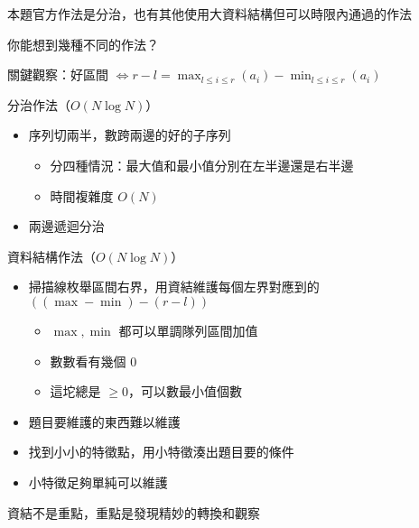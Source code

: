 \begin{frame}{}
    本題官方作法是分治，也有其他使用大資料結構但可以時限內通過的作法

    你能想到幾種不同的作法？
\end{frame}

\begin{frame}{}
    關鍵觀察：好區間 $\iff r - l = \max_{l \leq i \leq r}(a_i) - \min_{l \leq i \leq r}(a_i)$

     {
        分治作法（$O(N \log N)$）
    
        \begin{itemize}
            \item 序列切兩半，數跨兩邊的好的子序列
            \begin{itemize}
                \item 分四種情況：最大值和最小值分別在左半邊還是右半邊
                \item 時間複雜度 $O(N)$
            \end{itemize}
            \item 兩邊遞迴分治
        \end{itemize}
    }
     {
        資料結構作法（$O(N \log N)$）
    
        \begin{itemize}
            \item 掃描線枚舉區間右界，用資結維護每個左界對應到的 $\left(\left(\max - \min\right) - \left(r - l\right)\right)$
            \begin{itemize}
                \item $\max, \min$ 都可以單調隊列區間加值
                \item 數數看有幾個 $0$
                \item 這坨總是 $\geq 0$，可以數最小值個數
            \end{itemize}
        \end{itemize}
    }
\end{frame}

\begin{frame}{\ebtitle}
    \begin{itemize}
        \item 題目要維護的東西難以維護
        \item 找到小小的特徵點，用小特徵湊出題目要的條件
        \item 小特徵足夠單純可以維護
    \end{itemize}

    資結不是重點，重點是發現精妙的轉換和觀察
\end{frame}
